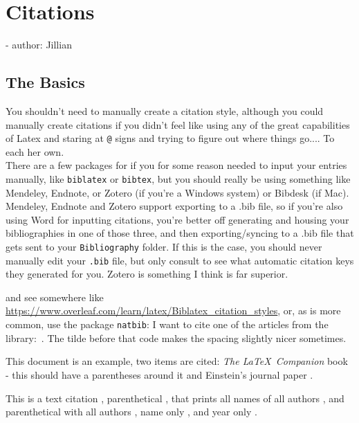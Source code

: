 \section{Citations}
- author: Jillian
\subsection{The Basics}
You shouldn't need to manually create a citation style, although you could manually create citations if you didn't feel like using any of the great capabilities of Latex and staring at \verb+@+ signs and trying to figure out where things go.... To each her own.\\

 There are a few packages for if you for some reason needed to input your entries manually, like \verb+biblatex+ or \verb+bibtex+, but you should really be using something like Mendeley, Endnote, or Zotero (if you're a Windows system) or Bibdesk (if Mac). Mendeley, Endnote and Zotero support exporting to a .bib file, so if you're also using Word for inputting citations, you're better off generating and housing your bibliographies in one of those three, and then exporting/syncing to a .bib file that gets sent to your  \verb+Bibliography+ folder. If this is the case, you should never manually edit your \verb+.bib+ file, but only consult to see what automatic citation keys they generated for you. Zotero is something I think is far superior.



 and see somewhere like \url{https://www.overleaf.com/learn/latex/Biblatex_citation_styles}, or, as is more common, use the package \verb+natbib+: 
I want to cite one of the articles from the library:~\cite{acemogluEnvironmentDirectedTechnical2012}. The tilde before that code makes the spacing slightly nicer sometimes.


This document is an example, two items are cited: \textit{The \LaTeX\ Companion} book  - this should have a parentheses around it \citep[see][chap 2]{acemogluEnvironmentDirectedTechnical2012} and Einstein's journal paper \cite{acemogluEnvironmentDirectedTechnical2012}. 

This is a text citation \citet{acemogluEnvironmentDirectedTechnical2012}, parenthetical \citep{acemogluEnvironmentDirectedTechnical2012}, that prints all names of all authors \cite*{acemogluEnvironmentDirectedTechnical2012}, and parenthetical with all authors \citep*{acemogluEnvironmentDirectedTechnical2012}, name only \citeauthor{acemogluEnvironmentDirectedTechnical2012}, and year only \citeyear{acemogluEnvironmentDirectedTechnical2012}. 


